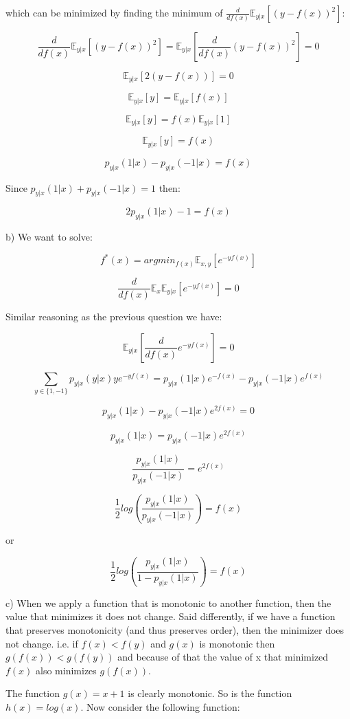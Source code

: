 \documentclass[12pt]{report}
\begin{document}
which can be minimized by finding the minimum of $\frac{d}{df(x)}\mathbb{E}_{y|x}[(y-f(x))^2]$:

$$ \frac{d}{df(x)}\mathbb{E}_{y|x}[(y-f(x))^2] =  \mathbb{E}_{y|x} \left[ \frac{d}{df(x)}(y-f(x))^2 \right] = 0$$

$$\mathbb{E}_{y|x}[2(y-f(x))] = 0$$

$$\mathbb{E}_{y|x}[y] = \mathbb{E}_{y|x}[f(x)] $$

$$\mathbb{E}_{y|x}[y] = f(x)\mathbb{E}_{y|x}[1] $$

$$\mathbb{E}_{y|x}[y] = f(x) $$

$$p_{y|x}(1|x) - p_{y|x}(-1|x) = f(x)$$

Since $p_{y|x}(1|x) + p_{y|x}(-1|x) = 1$ then:

$$2p_{y|x}(1|x) - 1 = f(x) $$

b) We want to solve:

$$f^{*}(x) =  argmin_{f(x)} \mathbb{E}_{x,y}[e^{-yf(x)}]$$

$$\frac{d}{df(x)}\mathbb{E}_{x}\mathbb{E}_{y|x} [e^{-yf(x)}] = 0 $$

Similar reasoning as the previous question we have:

$$\mathbb{E}_{y|x} \left[ \frac{d}{df(x)}e^{-yf(x)} \right] = 0 $$

$$\sum_{y \in \{1, -1 \}}p_{y|x}(y|x)ye^{-yf(x)} = p_{y|x}(1|x)e^{-f(x)} - p_{y|x}(-1|x)e^{f(x)}$$

$$p_{y|x}(1|x) - p_{y|x}(-1|x)e^{2f(x)} = 0$$

$$p_{y|x}(1|x) = p_{y|x}(-1|x)e^{2f(x)}$$

$$\frac{p_{y|x}(1|x)}{p_{y|x}(-1|x)} = e^{2f(x)}$$

$$\frac{1}{2}log\left( \frac{p_{y|x}(1|x)}{p_{y|x}(-1|x)} \right) = f(x)$$

or 

$$\frac{1}{2}log\left( \frac{p_{y|x}(1|x)}{1 - p_{y|x}(1|x)} \right) = f(x)$$

c) When we apply a function that is monotonic to another function, then the value that minimizes it does not change. Said differently, if we have a function that preserves monotonicity (and thus preserves order), then the minimizer does not change. i.e. if $f(x) < f(y)$ and $g(x)$ is monotonic then $ g( f(x) ) < g( f(y) )$ and because of that the value of x that minimized $f(x)$ also minimizes $g(f(x))$.

The function $g(x) = x + 1$ is clearly monotonic. So is the function $h(x) = log(x)$. Now consider the following function:
\end{document}

